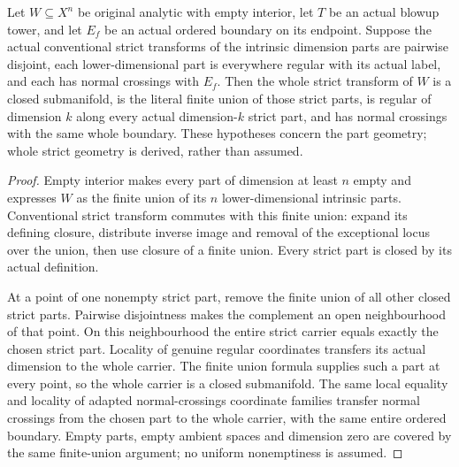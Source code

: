 \begin{lemma}
\label{hir:original-local-nonpure-whole-geometry}
\leanok
Let $W\subseteq X^n$ be original analytic with empty interior, let
$T$ be an actual blowup tower, and let $E_f$ be an actual ordered
boundary on its endpoint. Suppose the actual conventional strict
transforms of the intrinsic dimension parts are pairwise disjoint,
each lower-dimensional part is everywhere regular with its actual
label, and each has normal crossings with $E_f$. Then the whole
strict transform of $W$ is a closed submanifold, is the literal finite
union of those strict parts, is regular of dimension $k$ along every
actual dimension-$k$ strict part, and has normal crossings with the
same whole boundary. These hypotheses concern the part geometry;
whole strict geometry is derived, rather than assumed.
\end{lemma}
\begin{proof}
Empty interior makes every part of dimension at least $n$ empty and
expresses $W$ as the finite union of its $n$ lower-dimensional intrinsic
parts. Conventional strict transform commutes with this finite union:
expand its defining closure, distribute inverse image and removal of
the exceptional locus over the union, then use closure of a finite
union. Every strict part is closed by its actual definition.

At a point of one nonempty strict part, remove the finite union of
all other closed strict parts. Pairwise disjointness makes the
complement an open neighbourhood of that point. On this neighbourhood
the entire strict carrier equals exactly the chosen strict part.
Locality of genuine regular coordinates transfers its actual dimension
to the whole carrier. The finite union formula supplies such a part
at every point, so the whole carrier is a closed submanifold.
The same local equality and locality of adapted normal-crossings
coordinate families transfer normal crossings from the chosen part
to the whole carrier, with the same entire ordered boundary. Empty
parts, empty ambient spaces and dimension zero are covered by the
same finite-union argument; no uniform nonemptiness is assumed.
\end{proof}

